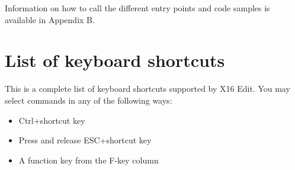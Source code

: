 \documentclass{article}
\begin{document}
        Information on how to call the different entry points and code samples is available in Appendix B. 

\appendix
\newpage
\section{List of keyboard shortcuts}
    This is a complete list of keyboard shortcuts supported
    by X16 Edit. You may select commands in any of the following ways:

    \begin{itemize}
        \item Ctrl+shortcut key
        \item Press and release ESC+shortcut key
        \item A function key from the F-key column
    \end{itemize}
\end{document}
